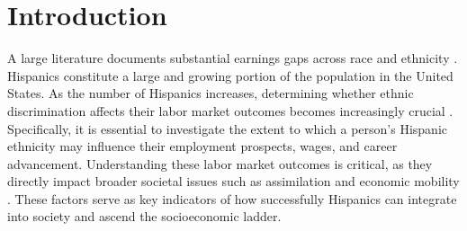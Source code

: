 
\section{Introduction}

A large literature documents substantial earnings gaps across race and ethnicity \autocite{bayer2018divergent, charles2008prejudice}. Hispanics constitute a large and growing portion of the population in the United States. As the number of Hispanics increases, determining whether ethnic discrimination affects their labor market outcomes becomes increasingly crucial \autocite{chettyUnitedStatesStill2014, chettyEffectsExposureBetter2016,chettyFadingAmericanDream2017}. Specifically, it is essential to investigate the extent to which a person's Hispanic ethnicity may influence their employment prospects, wages, and career advancement. Understanding these labor market outcomes is critical, as they directly impact broader societal issues such as assimilation and economic mobility \autocite{chettyUnitedStatesStill2014,chettyEffectsExposureBetter2016}. These factors serve as key indicators of how successfully Hispanics can integrate into society and ascend the socioeconomic ladder.

